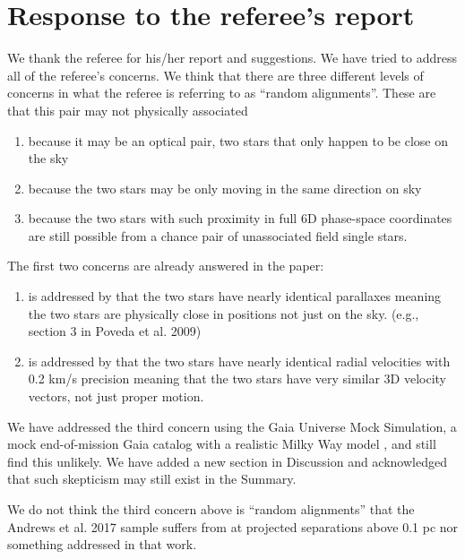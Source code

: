 \documentclass[12pt]{article}
\begin{document}
\section*{Response to the referee's report}
\label{response-to-the-referees-report}

We thank the referee for his/her report and suggestions. 
We have tried to address all of the referee's concerns.
We think that there are three different levels of concerns
in what the referee is referring to as ``random alignments''.
These are that this pair may not physically associated

\begin{enumerate}
\def\labelenumi{\arabic{enumi}.}
\itemsep1pt\parskip0pt
\item
  because it may be an optical pair, two stars that only happen to be
  close on the sky
\item
  because the two stars may be only moving in the same direction on sky
\item
  because the two stars with such proximity in full 6D phase-space
  coordinates are still possible from a chance pair of unassociated
  field single stars.
\end{enumerate}

The first two concerns are already answered in the paper:

\begin{enumerate}
\def\labelenumi{\arabic{enumi}.}
\itemsep1pt\parskip0pt
\item
  is addressed by that the two stars have nearly identical parallaxes
  meaning the two stars are physically close in positions not just on the
  sky. (e.g., section 3 in Poveda et al. 2009)
\item
  is addressed by that the two stars have nearly identical radial
  velocities with 0.2 km/s precision meaning that the two stars have
  very similar 3D velocity vectors, not just proper motion.
\end{enumerate}

We have addressed the third concern using the Gaia
Universe Mock Simulation, a mock end-of-mission Gaia catalog with a realistic
Milky Way model \citep{gums}, and still find this unlikely. We have added a new
section in Discussion and acknowledged that such skepticism may still exist in
the Summary.

We do not think the third concern above is ``random alignments'' that the
Andrews et al. 2017 sample suffers from at projected separations above 0.1 pc
nor something addressed in that work.
\end{document}
